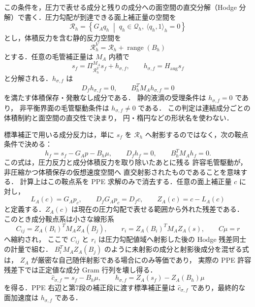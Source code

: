 この条件を，圧力で表せる成分と残りの成分への面空間の直交分解（Hodge 分解）で書く．圧力勾配が到達できる面上補正量の空間を
\begin{equation}
  \mathcal{R}_h
  =
  \left\{
    G_A q_h\;\middle|\;
    q_h\in\mathcal{Q}_h,\ \langle q_h,1\rangle_h=0
  \right\}
  \label{eq:capillary_pressure_gradient_range}
\end{equation}
とし，体積反力を含む静的反力空間を
\begin{equation}
  \mathcal{R}_{h}^{V}
  =
  \mathcal{R}_h+\operatorname{range}(B_h)
  \label{eq:capillary_augmented_reaction_range}
\end{equation}
とする．任意の毛管補正量は $M_A$ 内積で
\begin{equation}
  s_f
  =
  \Pi_{\mathcal{R}_{h}^{V}}^{M_A}s_f
  +h_{\sigma,f},
  \qquad
  h_{\sigma,f}
  =
  H_{\mathrm{aug}}s_f
  \label{eq:capillary_hodge_decomposition}
\end{equation}
と分解される．$h_{\sigma,f}$ は
\[
  D_f h_{\sigma,f}=0,\qquad B_h^T M_A h_{\sigma,f}=0
\]
を満たす体積保存・発散なし成分である．
静的液滴の受理条件は $h_{\sigma,f}=0$ であり，
非平衡界面の毛管駆動条件は $h_{\sigma,f}\ne0$ である．
この判定は連結成分ごとの体積制約と面空間の直交性で決まり，
円・楕円などの形状名を使わない．

標準補正で用いる成分反力は，単に $s_f$ を
$\mathcal{R}_h$ へ射影するのではなく，次の鞍点条件で決める：
\begin{equation}
  h_f=s_f-G_Ap-B_h\mu,\qquad
  D_fh_f=0,\qquad
  B_h^TM_Ah_f=0 .
  \label{eq:capillary_component_saddle}
\end{equation}
この式は，圧力反力と成分体積反力を取り除いたあとに残る
許容毛管駆動が，非圧縮かつ体積保存の仮想速度空間へ
直交射影されたものであることを意味する．
計算上はこの鞍点系を PPE 求解のみで消去する．任意の面上補正量 $c$ に対し，
\begin{equation}
  L_A(c)=G_Ap_c,\qquad
  D_fG_Ap_c=D_fc,\qquad
  Z_A(c)=c-L_A(c)
  \label{eq:capillary_range_projection}
\end{equation}
と定義する．$Z_A(c)$ は現在の圧力勾配で表せる範囲から外れた残差である．
このとき成分鞍点系は小さな線形系
\begin{equation}
  C_{ij}=Z_A(B_i)^TM_AZ_A(B_j),\qquad
  r_i=Z_A(B_i)^TM_AZ_A(s),\qquad
  C\mu=r
  \label{eq:capillary_component_saddle_elimination}
\end{equation}
へ縮約され，
ここで $C_{ij}$ と $r_i$ は圧力勾配値域へ射影した後の
Hodge 残差同士の計量で組む．
$B_i^TM_AZ_A(B_j)$ のように未射影の成分と射影後成分を混ぜる式は，
$Z_A$ が厳密な自己随伴射影である場合にのみ等価であり，
実際の PPE 許容残差下では正定値な成分 Gram 行列を壊し得る．
\begin{equation}
  \widehat c_{\sigma,f}=s_f-B_h\mu,\qquad
  h_{\sigma,f}=Z_A(s_f)-Z_A(B_h)\mu
  \label{eq:capillary_corrected_cochain_and_drive}
\end{equation}
を得る．PPE 右辺と第7段の補正段に渡す標準補正量は
$\widehat c_{\sigma,f}$ であり，最終的な面加速度は
$h_{\sigma,f}$ である．

